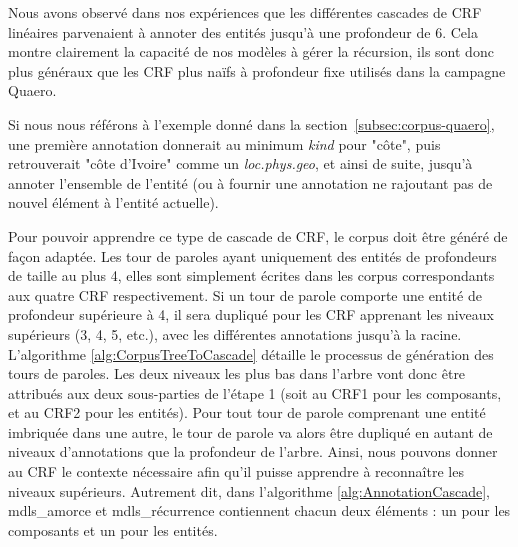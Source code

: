 \documentclass[12pt,a4paper,times,twoside,openright]{report}
\begin{document}
Nous avons observé dans nos expériences que les différentes cascades de CRF linéaires parvenaient à annoter des entités jusqu'à une profondeur de 6. Cela montre clairement la capacité de nos modèles à gérer la récursion, ils sont donc plus généraux que les CRF plus naïfs à profondeur fixe utilisés dans la campagne Quaero.

Si nous nous référons à l'exemple donné dans la section\ \ref{subsec:corpus-quaero}, une première annotation donnerait au minimum \emph{kind} pour "côte", puis retrouverait "côte d'Ivoire" comme un \emph{loc.phys.geo}, et ainsi de suite, jusqu'à annoter l'ensemble de l'entité (ou à fournir une annotation ne rajoutant pas de nouvel élément à l'entité actuelle).

Pour pouvoir apprendre ce type de cascade de CRF, le corpus doit être généré de façon adaptée. Les tour de paroles ayant uniquement des entités de profondeurs de taille au plus 4, elles sont simplement écrites dans les corpus correspondants aux quatre CRF respectivement. Si un tour de parole comporte une entité de profondeur supérieure à 4, il sera dupliqué pour les CRF apprenant les niveaux supérieurs (3, 4, 5, etc.), avec les différentes annotations jusqu'à la racine. L'algorithme \ref{alg:CorpusTreeToCascade} détaille le processus de génération des tours de paroles. Les deux niveaux les plus bas dans l'arbre vont donc être attribués aux deux sous-parties de l'étape 1 (soit au CRF1 pour les composants, et au CRF2 pour les entités). Pour tout tour de parole comprenant une entité imbriquée dans une autre, le tour de parole va alors être dupliqué en autant de niveaux d'annotations que la profondeur de l'arbre. Ainsi, nous pouvons donner au CRF le contexte nécessaire afin qu'il puisse apprendre à reconnaître les niveaux supérieurs. Autrement dit, dans l'algorithme \ref{alg:AnnotationCascade}, mdls\_amorce et mdls\_récurrence contiennent chacun deux éléments : un pour les composants et un pour les entités.
\end{document}
